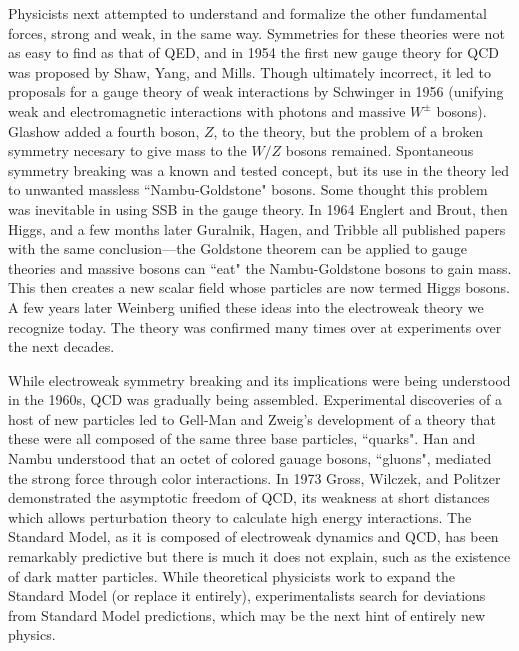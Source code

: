 Physicists next attempted to understand and formalize the other fundamental forces, strong and weak, in the same way. Symmetries for these theories were not as easy to find as that of QED, and in 1954 the first new gauge theory for QCD was proposed by Shaw, Yang, and Mills. Though ultimately incorrect, it led to proposals for a gauge theory of weak interactions by Schwinger in 1956 (unifying weak and electromagnetic interactions with photons and massive $W^\pm$ bosons). Glashow added a fourth boson, $Z$, to the theory, but the problem of a broken symmetry necesary to give mass to the $W/Z$ bosons remained. Spontaneous symmetry breaking was a known and tested concept, but its use in the theory led to unwanted massless ``Nambu-Goldstone" bosons. Some thought this problem was inevitable in using SSB in the gauge theory. In 1964 Englert and Brout, then Higgs, and a few months later Guralnik, Hagen, and Tribble all published papers with the same conclusion---the Goldstone theorem can be applied to gauge theories and massive bosons can ``eat" the Nambu-Goldstone bosons to gain mass. This then creates a new scalar field whose particles are now termed Higgs bosons. A few years later Weinberg unified these ideas into the electroweak theory we recognize today. The theory was confirmed many times over at experiments over the next decades. 

While electroweak symmetry breaking and its implications were being understood in the 1960s, QCD was gradually being assembled. Experimental discoveries of a host of new particles led to Gell-Man and Zweig's development of a theory that these were all composed of the same three base particles, ``quarks". Han and Nambu understood that an octet of colored gauage bosons, ``gluons", mediated the strong force through color interactions. In 1973 Gross, Wilczek, and Politzer demonstrated the asymptotic freedom of QCD, its weakness at short distances which allows perturbation theory to calculate high energy interactions. The Standard Model, as it is composed of electroweak dynamics and QCD, has been remarkably predictive but there is much it does not explain, such as the existence of dark matter particles. While theoretical physicists work to expand the Standard Model (or replace it entirely), experimentalists search for deviations from Standard Model predictions, which may be the next hint of entirely new physics. 

